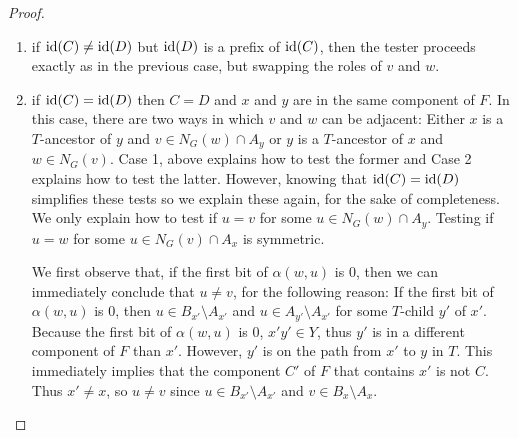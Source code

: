 \begin{proof}
\begin{enumerate}
\begin{itemize}
      \item If the first bit of $\alpha(w,u)=1$, then $\alpha(w,u)=\langle 1, \bin(\idx(C')), \rho_{C'}(x'), \mu_{x'}(A_{y'}\setminus A_{x'}), \kappa_{x'}(A_{y'}\setminus A_{x'}, u)\rangle$, where $x'$ is the home of $u$ in $\mathcal{T}$ and $C'$ is the component of $F$ that contains $x'$.  In this case, the first $\idx(C')$ parts of $\id(y)$ gives $\id(C')$.  Then $\id(x')=\id(C')\circ\rho_{C'}(x')$.  The tester first checks that $\id(x')=\id(x)$.  If not, then $x'\neq x$ and $u\neq v$ since $u\in B_{x'}\setminus A_{x'}$ and $v\in B_x\setminus A_x$. If $\id(x')=\id(x)$ then $x'=x$ since $\id$ is injective.  In this case, the tester can check if $u=v$ by checking if $I(\mu_{x'}(A_{y'}\setminus A_{x'}),\kappa_{x'}(A_{y'}\setminus A_{x'}, u), \mu_{x}(v))=1$.  If so, then $v=u\in N_G(w)$ so the tester outputs $A'(\mu(v),\mu(w)):=1$.  If not, the tester continues with the next entry (if any) in $\alpha(w)$. 
    \end{itemize}
    \item if $\operatorname{id}(C)\neq\operatorname{id}(D)$ but $\operatorname{id}(D)$ is a prefix of $\operatorname{id}(C)$, then the tester proceeds exactly as in the previous case, but swapping the roles of $v$ and $w$. 
    \item if $\operatorname{id}(C)=\operatorname{id}(D)$ then $C=D$ and $x$ and $y$ are in the same component of $F$.  In this case, there are two ways in which $v$ and $w$ can be adjacent:  Either $x$ is a $T$-ancestor of $y$ and $v\in N_G(w)\cap A_y$ or $y$ is a $T$-ancestor of $x$ and $w\in N_G(v)$.  Case 1, above explains how to test the former and Case 2 explains how to test the latter.
    However, knowing that $\operatorname{id}(C)=\operatorname{id}(D)$ simplifies these tests so we explain these again, for the sake of completeness.  We only explain how to test if $u=v$ for some $u\in N_G(w)\cap A_y$.  Testing if $u=w$ for some $u\in N_G(v)\cap A_x$ is symmetric.

    We first observe that, if the first bit of $\alpha(w,u)$ is $0$, then we can immediately conclude that $u\neq v$, for the following reason: If the first bit of $\alpha(w,u)$ is $0$, then $u\in B_{x'}\setminus A_{x'}$ and $u\in A_{y'}\setminus A_{x'}$ for some $T$-child $y'$ of $x'$.  Because the first bit of $\alpha(w,u)$ is $0$,  $x'y'\in Y$, thus $y'$ is in a different component of $F$ than $x'$.  However, $y'$ is on the path from $x'$ to $y$ in $T$. This immediately implies that the component $C'$ of $F$ that contains $x'$ is not $C$.  Thus $x'\neq x$, so $u\neq v$ since $u\in B_{x'}\setminus A_{x'}$ and $v\in B_x\setminus A_x$.


\end{enumerate}
\end{proof}
